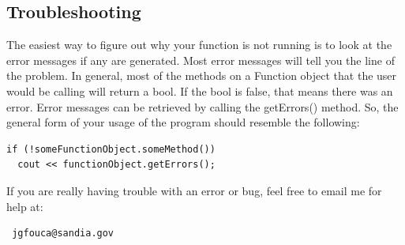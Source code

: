 \documentclass{article}
\begin{document}
\subsection{Troubleshooting}

The easiest way to figure out why your function is not running is to look at
the error messages if any are generated. Most error messages will tell you the
line of the problem. In general, most of the methods on a Function object that 
the user would be calling will return a bool. If the bool is false, that means
there was an error. Error messages can be retrieved by calling the getErrors() 
method. So, the general form of your usage of the program should resemble the 
following:
{\ttfamily \begin{verbatim}
if (!someFunctionObject.someMethod()) 
  cout << functionObject.getErrors();
\end{verbatim} }

\noindent
If you are really having trouble with an error or bug, feel free to email me
for help at: \begin{verbatim} jgfouca@sandia.gov \end{verbatim}
\end{document}
